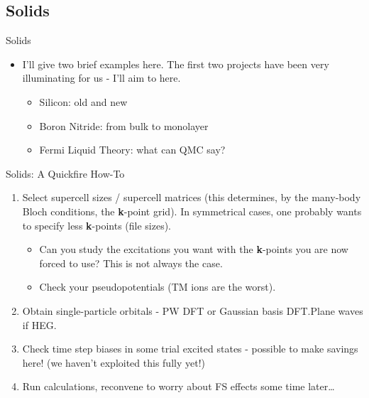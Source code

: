 \documentclass[12pt, pdf, hyperref={draft}, usenames, dvipsnames,
aspectratio=169]{beamer}
\newcommand{\green}[1]{{\bf\color{ForestGreen}{#1}}}
\begin{document}
\subsection{Solids}\label{sub:solids}

\begin{frame}{Solids}

\begin{itemize}

  \item I'll give two brief examples here. The first two projects have been
  very illuminating for us - I'll aim to \green{share some wisdom} here.

  \begin{itemize}
    \item Silicon: old and new
    \item Boron Nitride: from bulk to monolayer
    \item Fermi Liquid Theory: what can QMC say?

  \end{itemize}
\end{itemize}
\end{frame}


\begin{frame}{Solids: A Quickfire How-To}

\begin{enumerate}
  \item Select supercell sizes / supercell matrices (this determines, by the
  many-body Bloch conditions, the {\bf k}-point grid). In symmetrical cases, one
  probably wants to specify less {\bf k}-points (file sizes).
  \begin{itemize}
    \item Can you study the excitations you want with the {\bf k}-points you
    are now forced to use? This is not always the case.
    \item Check your pseudopotentials (TM ions are the
    worst).
  \end{itemize}
  \item Obtain single-particle orbitals - PW DFT or Gaussian basis DFT.\@ Plane
  waves if HEG.\@
  \item Check time step biases in some trial excited states - possible to make
  savings here! (we haven't exploited this fully yet!)
  \item Run calculations, reconvene to worry about FS effects some time
  later\ldots
\end{enumerate}
\end{frame}
\end{document}
